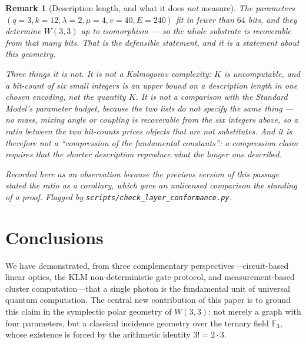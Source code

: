 ﻿\documentclass[12pt]{article}
\newtheorem{remark}[theorem]{Remark}
\newcommand{\GF}[1]{\mathbb{F}_{#1}}
\begin{document}
\begin{remark}[Description length, and what it does \emph{not} measure]
The parameters $(q=3, k=12, \lambda=2, \mu=4, v=40, E=240)$ fit in fewer than $64$ bits,
and they determine $W(3,3)$ up to isomorphism --- so the whole substrate is recoverable
from that many bits. That is the defensible statement, and it is a statement about
\emph{this geometry}.

Three things it is not. It is not a Kolmogorov complexity: $K$ is uncomputable, and a
bit-count of six small integers is an upper bound on a description length in one chosen
encoding, not the quantity $K$. It is not a comparison with the Standard Model's parameter
budget, because the two lists do not specify the same thing --- no mass, mixing angle or
coupling is recoverable from the six integers above, so a ratio between the two bit-counts
prices objects that are not substitutes. And it is therefore not a ``compression of the
fundamental constants'': a compression claim requires that the shorter description
reproduce what the longer one described.

Recorded here as an observation because the previous version of this passage stated the
ratio as a corollary, which gave an unlicensed comparison the standing of a proof. Flagged
by \texttt{scripts/check\_layer\_conformance.py}.
\end{remark}

\section{Conclusions}
\label{sec:conclusions}

We have demonstrated, from three complementary perspectives---circuit-based linear
optics, the KLM non-deterministic gate protocol, and measurement-based cluster
computation---that a single photon is the fundamental unit of universal quantum
computation.  The central new contribution of this paper is to ground this claim in
the symplectic polar geometry of $W(3,3)$: not merely a graph with four parameters,
but a classical incidence geometry over the ternary field $\GF{3}$, whose existence
is forced by the arithmetic identity $3! = 2 \cdot 3$.
\end{document}
